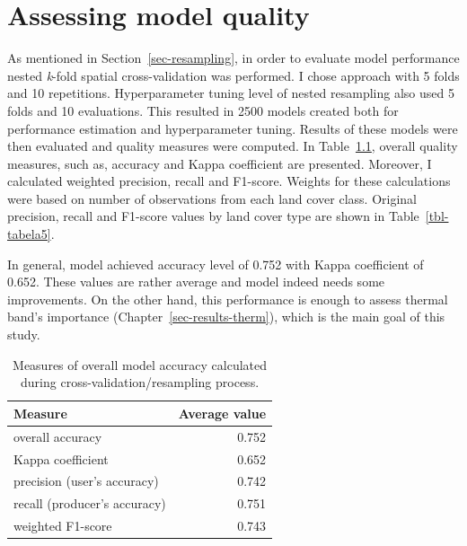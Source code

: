 \documentclass{amuthesis}
\begin{document}

\hypertarget{sec-results-eval}{%
\chapter{Assessing model quality}\label{sec-results-eval}}

As mentioned in Section~\ref{sec-resampling}, in order to evaluate model
performance nested \emph{k}-fold spatial cross-validation was performed.
I chose approach with 5 folds and 10 repetitions. Hyperparameter tuning
level of nested resampling also used 5 folds and 10 evaluations. This
resulted in 2500 models created both for performance estimation and
hyperparameter tuning. Results of these models were then evaluated and
quality measures were computed. In Table~\ref{tbl-tabela4}, overall
quality measures, such as, accuracy and Kappa coefficient are presented.
Moreover, I calculated weighted precision, recall and F1-score. Weights
for these calculations were based on number of observations from each
land cover class. Original precision, recall and F1-score values by land
cover type are shown in Table~\ref{tbl-tabela5}.

In general, model achieved accuracy level of 0.752 with Kappa
coefficient of 0.652. These values are rather average and model indeed
needs some improvements. On the other hand, this performance is enough
to assess thermal band's importance (Chapter~\ref{sec-results-therm}),
which is the main goal of this study.

\hypertarget{tbl-tabela4}{}
\begin{table}
\caption{\label{tbl-tabela4}Measures of overall model accuracy calculated during
cross-validation/resampling process. }\tabularnewline

\centering
\begin{tabular}{|>{}l|>{}r|}
\toprule
\textbf{Measure} & \textbf{Average value}\\
\midrule
overall accuracy & 0.752\\
\hline
Kappa coefficient & 0.652\\
\hline
precision (user's accuracy) & 0.742\\
\hline
recall (producer's accuracy) & 0.751\\
\hline
weighted F1-score & 0.743\\
\bottomrule
\end{tabular}
\end{table}
\end{document}
